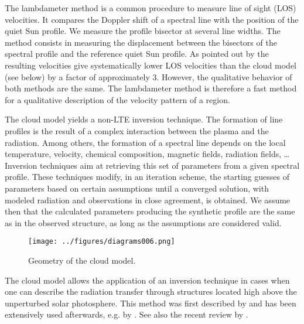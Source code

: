 The lambdameter method \citep{1993A&A...271..574T} is a common procedure to measure line of sight (LOS) velocities. It compares the Doppler shift of a spectral line with the position of the quiet Sun profile. We measure the profile bisector at several line widths. The method consists in measuring the displacement between the bisectors of the spectral profile and the reference quiet Sun profile. As pointed out by \cite{1990A&A...230..200A} the resulting velocities give systematically lower LOS velocities than the cloud model (see below) by a factor of approximately $3$. However, the qualitative behavior of both methods are the same. The lambdameter method is therefore a fast method for a qualitative description of the velocity pattern of a region.

The cloud model yields a non-LTE inversion technique. The formation of line profiles is the result of a complex interaction between the plasma and the radiation. Among others, the formation of a spectral line depends on the local  temperature, velocity, chemical composition, magnetic fields, radiation fields, \dots Inversion techniques aim at retrieving this set of parameters from a given spectral profile.  These techniques modify, in an iteration scheme, the starting guesses of parameters based on certain assumptions until a converged solution, with modeled radiation and observations in close agreement, is obtained. We assume then that the calculated parameters producing the synthetic profile are the same as in the observed structure, as long as the assumptions are considered valid.

\pagebreak
\begin{wrapfigure}[19]{r}{0.4\textwidth}
\begin{center}
\texttt{[image: ../figures/diagrams006.png]}
\caption{Geometry of the cloud model.}
\label{cloud:geo}
\end{center}
\end{wrapfigure}

The cloud model allows the application of an inversion technique in cases when one can describe  the radiation transfer through structures located high above the unperturbed solar photosphere. This method was first described by \citet{1964PhDT........83B} and has been extensively used afterwards, e.g. by \citet{tsiropoula97,2004A&A...424..279T,2004A&A...423.1133T,2004A&A...418.1131A}. See also the recent review by \citet{2007ASPC..368..217T}. 


